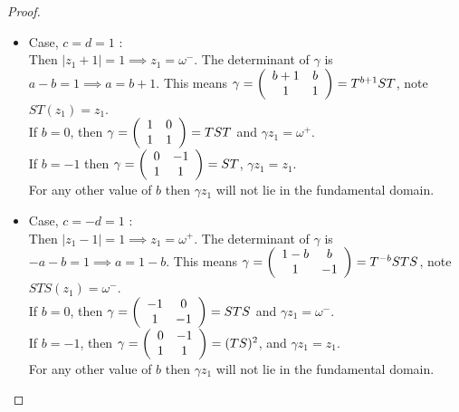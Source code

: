 \begin{proof}
\begin{enumerate}[(i)]
\begin{itemize}
\item Case, $c = d = 1$ : \\
Then $ |z_1 + 1| =1 \implies  z_1 = \omega^- $. The determinant of $\gamma$ is $a -b  =1 \implies a = b +1$. This means $\gamma =  \left(\begin{array}{ c c } b+1 &  b \\ 1 & 1 \end{array} \right)= T^{b+1}ST$, note $ST(z_1) = z_1$. \\
If $b = 0$, then $\gamma = \left(\begin{array}{ c c } 1 &  0 \\ 1 & 1 \end{array} \right) = TST$ and $\gamma z_1 =\omega^+$.\\
If $b = -1$ then $\gamma = \left(\begin{array}{ c c } 0 & -1 \\ 1 & 1 \end{array} \right) = ST$, $\gamma z_1 = z_1$.\\
For any other value of $b$ then $\gamma z_1$ will not lie in the fundamental domain.

\item Case, $c = -d = 1$ : \\
Then $|z_1 -1 | = 1 \implies z_1 = \omega^+$. The determinant of $\gamma$ is $ -a -b =1 \implies a = 1-b$. This means $\gamma =  \left(\begin{array}{ c c } 1-b &  b \\ 1 & -1 \end{array} \right) =  T^{-b}STS$, note $ STS(z_1) = \omega^-$. \\
If $b = 0$, then $\gamma = \left(\begin{array}{ c c } -1 &  0 \\ 1 & -1 \end{array} \right) = STS$ and $\gamma z_1 = \omega^-$.\\
If $b =-1$, then $\gamma = \left(\begin{array}{ c c } 0 &  -1 \\ 1 & 1 \end{array} \right) = (TS)^2$, and $\gamma z_1 = z_1$.\\
For any other value of $b$ then $\gamma z_1$ will not lie in the fundamental domain.


\end{itemize}
\end{enumerate}
\end{proof}
